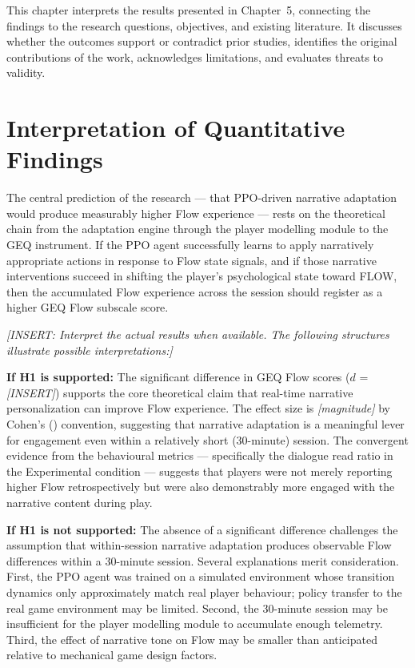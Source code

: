 \documentclass[12pt,a4paper]{report}
\begin{document}
This chapter interprets the results presented in Chapter~5, connecting the findings to the research questions, objectives, and existing literature. It discusses whether the outcomes support or contradict prior studies, identifies the original contributions of the work, acknowledges limitations, and evaluates threats to validity.

\section{Interpretation of Quantitative Findings}

The central prediction of the research --- that PPO-driven narrative adaptation would produce measurably higher Flow experience --- rests on the theoretical chain from the adaptation engine through the player modelling module to the GEQ instrument. If the PPO agent successfully learns to apply narratively appropriate actions in response to Flow state signals, and if those narrative interventions succeed in shifting the player's psychological state toward FLOW, then the accumulated Flow experience across the session should register as a higher GEQ Flow subscale score.

\textit{[INSERT: Interpret the actual results when available. The following structures illustrate possible interpretations:]}

\textbf{If H1 is supported:} The significant difference in GEQ Flow scores ($d$ = \textit{[INSERT]}) supports the core theoretical claim that real-time narrative personalization can improve Flow experience. The effect size is \textit{[magnitude]} by Cohen's (\citeyear{cohen1988statistical}) convention, suggesting that narrative adaptation is a meaningful lever for engagement even within a relatively short (30-minute) session. The convergent evidence from the behavioural metrics --- specifically the dialogue read ratio in the Experimental condition --- suggests that players were not merely reporting higher Flow retrospectively but were also demonstrably more engaged with the narrative content during play.

\textbf{If H1 is not supported:} The absence of a significant difference challenges the assumption that within-session narrative adaptation produces observable Flow differences within a 30-minute session. Several explanations merit consideration. First, the PPO agent was trained on a simulated environment whose transition dynamics only approximately match real player behaviour; policy transfer to the real game environment may be limited. Second, the 30-minute session may be insufficient for the player modelling module to accumulate enough telemetry. Third, the effect of narrative tone on Flow may be smaller than anticipated relative to mechanical game design factors.
\end{document}
